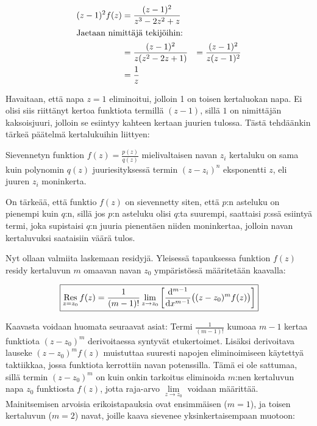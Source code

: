 \documentclass[../integrointiopas.tex]{subfiles}
\begin{document}
	\begin{align}
		(z - 1)^2f(z) &= \frac{(z - 1)^2}{z^3 - 2z^2 + z} \\
		\intertext{Jaetaan nimittäjä tekijöihin:}
		&= \frac{(z - 1)^2}{z(z^2 - 2z + 1)}
		&= \frac{(z - 1)^2}{z(z -  1)^2} \\
		&= \frac{1}{z}
	\end{align}

	Havaitaan, että napa $z = 1$ eliminoitui, jolloin 1 on toisen kertaluokan napa. Ei olisi siis riittänyt kertoa funktiota termillä $(z - 1)$, sillä $1$ on nimittäjän kaksoisjuuri, jolloin se esiintyy kahteen kertaan juurien tulossa. Tästä tehdäänkin tärkeä päätelmä kertalukuihin liittyen:
	
	\begin{remark}
		Sievennetyn funktion $f(z) = \frac{p(z)}{q(z)}$ mielivaltaisen navan $z_i$ kertaluku on sama kuin polynomin $q(z)$ juuriesityksessä termin $(z - z_i)^n$ eksponentti $z$, eli juuren $z_i$ moninkerta.
	\end{remark}
	
	On tärkeää, että funktio $f(z)$ on sievennetty siten, että $p$:n asteluku on pienempi kuin $q$:n, sillä jos $p$:n asteluku olisi $q$:ta suurempi, saattaisi $p$:ssä esiintyä termi, joka supistaisi $q$:n juuria pienentäen niiden moninkertaa, jolloin navan kertaluvuksi saataisiin väärä tulos.
	
	Nyt ollaan valmiita laskemaan residyjä. Yleisessä tapauksessa funktion $f(z)$ residy kertaluvun $m$ omaavan navan $z_0$ ympäristössä määritetään kaavalla:
	
	\begin{equation}
		\boxed{\res{z = z_0}f(z) = \frac{1}{(m - 1)!}\lim_{z\to z_0}\left[\odv{^{m - 1}}{x^{m - 1}}\big((z - z_0)^{m}f(z)\big)\right]}
	\end{equation}

	Kaavasta voidaan huomata seuraavat asiat: Termi $\frac{1}{(m - 1)!}$ kumoaa $m - 1$ kertaa funktiota $(z - z_0)^m$ derivoitaessa syntyvät etukertoimet. Lisäksi derivoitava lauseke $(z - z_0)^{m}f(z)$ muistuttaa suuresti napojen eliminoimiseen käytettyä taktiikkaa, jossa funktiota kerrottiin navan potenssilla. Tämä ei ole sattumaa, sillä termin $(z - z_0)^{m}$ on kuin onkin tarkoitus eliminoida $m$:nen kertaluvun napa $z_0$ funktiosta $f(z)$, jotta raja-arvo $\lim\limits_{z\to z_0}$ voidaan määrittää. Mainitsemisen arvoisia erikoistapauksia ovat ensimmäisen ($m = 1$), ja toisen kertaluvun ($m = 2$) navat, joille kaava sievenee yksinkertaisempaan muotoon:
	
\end{document}
